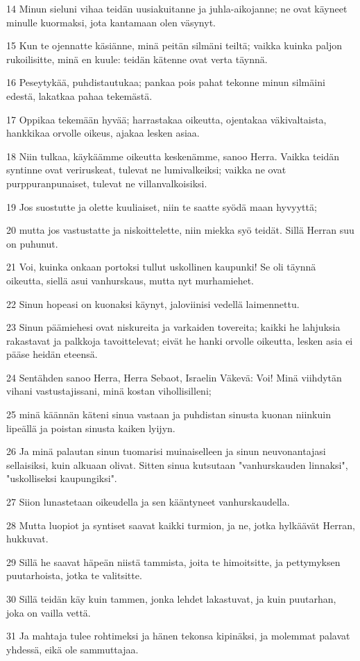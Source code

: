 \par 14 Minun sieluni vihaa teidän uusiakuitanne ja juhla-aikojanne; ne ovat käyneet minulle kuormaksi, jota kantamaan olen väsynyt.
\par 15 Kun te ojennatte käsiänne, minä peitän silmäni teiltä; vaikka kuinka paljon rukoilisitte, minä en kuule: teidän kätenne ovat verta täynnä.
\par 16 Peseytykää, puhdistautukaa; pankaa pois pahat tekonne minun silmäini edestä, lakatkaa pahaa tekemästä.
\par 17 Oppikaa tekemään hyvää; harrastakaa oikeutta, ojentakaa väkivaltaista, hankkikaa orvolle oikeus, ajakaa lesken asiaa.
\par 18 Niin tulkaa, käykäämme oikeutta keskenämme, sanoo Herra. Vaikka teidän syntinne ovat veriruskeat, tulevat ne lumivalkeiksi; vaikka ne ovat purppuranpunaiset, tulevat ne villanvalkoisiksi.
\par 19 Jos suostutte ja olette kuuliaiset, niin te saatte syödä maan hyvyyttä;
\par 20 mutta jos vastustatte ja niskoittelette, niin miekka syö teidät. Sillä Herran suu on puhunut.
\par 21 Voi, kuinka onkaan portoksi tullut uskollinen kaupunki! Se oli täynnä oikeutta, siellä asui vanhurskaus, mutta nyt murhamiehet.
\par 22 Sinun hopeasi on kuonaksi käynyt, jaloviinisi vedellä laimennettu.
\par 23 Sinun päämiehesi ovat niskureita ja varkaiden tovereita; kaikki he lahjuksia rakastavat ja palkkoja tavoittelevat; eivät he hanki orvolle oikeutta, lesken asia ei pääse heidän eteensä.
\par 24 Sentähden sanoo Herra, Herra Sebaot, Israelin Väkevä: Voi! Minä viihdytän vihani vastustajissani, minä kostan vihollisilleni;
\par 25 minä käännän käteni sinua vastaan ja puhdistan sinusta kuonan niinkuin lipeällä ja poistan sinusta kaiken lyijyn.
\par 26 Ja minä palautan sinun tuomarisi muinaiselleen ja sinun neuvonantajasi sellaisiksi, kuin alkuaan olivat. Sitten sinua kutsutaan "vanhurskauden linnaksi", "uskolliseksi kaupungiksi".
\par 27 Siion lunastetaan oikeudella ja sen kääntyneet vanhurskaudella.
\par 28 Mutta luopiot ja syntiset saavat kaikki turmion, ja ne, jotka hylkäävät Herran, hukkuvat.
\par 29 Sillä he saavat häpeän niistä tammista, joita te himoitsitte, ja pettymyksen puutarhoista, jotka te valitsitte.
\par 30 Sillä teidän käy kuin tammen, jonka lehdet lakastuvat, ja kuin puutarhan, joka on vailla vettä.
\par 31 Ja mahtaja tulee rohtimeksi ja hänen tekonsa kipinäksi, ja molemmat palavat yhdessä, eikä ole sammuttajaa.

